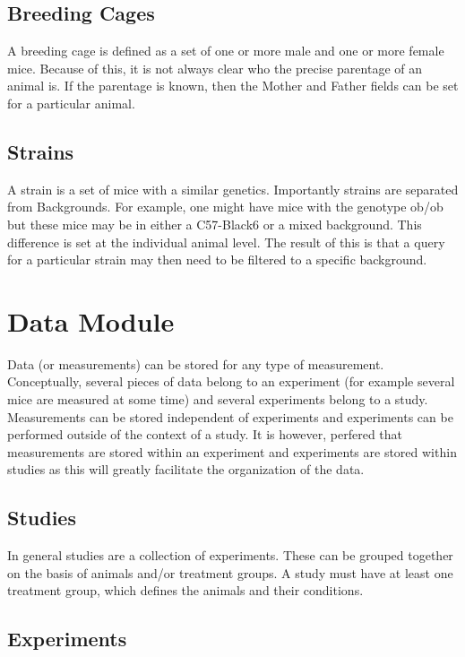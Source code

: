 \documentclass[letterpaper,10pt,english]{sphinxmanual}
\begin{document}
\subsection{Breeding Cages}

A breeding cage is defined as a set of one or more male and one or more female mice.  Because of this, it is not always clear who the precise parentage of an animal is.  If the parentage is known, then the Mother and Father fields can be set for a particular animal.


\subsection{Strains}

A strain is a set of mice with a similar genetics.  Importantly strains are separated from Backgrounds.  For example, one might have mice with the genotype ob/ob but these mice may be in either a C57-Black6 or a mixed background.  This difference is set at the individual animal level.
The result of this is that a query for a particular strain may then need to be filtered to a specific background.


\section{Data Module}

Data (or measurements) can be stored for any type of measurement.  Conceptually, several pieces of data belong to an experiment (for example several mice are measured at some time) and several experiments belong to a study.  Measurements can be stored independent of experiments and experiments can be performed outside of the context of a study.  It is however, perfered that measurements are stored within an experiment and experiments are stored within studies as this will greatly facilitate the organization of the data.


\subsection{Studies}

In general studies are a collection of experiments.  These can be grouped together on the basis of animals and/or treatment groups.  A study must have at least one treatment group, which defines the animals and their conditions.


\subsection{Experiments}
\end{document}
